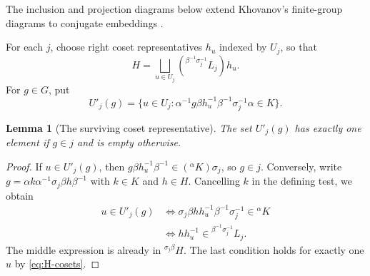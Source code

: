 \documentclass[11pt,a4paper]{article}
\numberwithin{equation}{section}
\newtheorem{lemma}[theorem]{Lemma}
\theoremstyle{definition}
\newcommand{\cg}[2]{{}^{#1}\!#2}
\begin{document}
The inclusion and projection diagrams below extend Khovanov's
finite-group diagrams to conjugate embeddings \cite[Prop.~6]{khovanov}.

For each \(j\), choose right coset representatives \(h_u\) indexed by
\(U_j\), so that
\begin{equation}\label{eq:H-cosets}
 H=\bigsqcup_{u\in U_j}(\cg{\beta^{-1}\sigma_j^{-1}}{L_j})h_u .
\end{equation}
For \(g\in G\), put
\[
 U'_j(g)=\{u\in U_j:
   \alpha^{-1}g\beta h_u^{-1}\beta^{-1}\sigma_j^{-1}\alpha\in K\}.
\]

\begin{lemma}[The surviving coset representative]\label{lem:first-filter}
The set \(U'_j(g)\) has exactly one element if \(g\in j\) and is
empty otherwise.
\end{lemma}

\begin{proof}
If \(u\in U'_j(g)\), then
\(g\beta h_u^{-1}\beta^{-1}\in(\cg{\alpha}{K})\sigma_j\), so \(g\in j\).
Conversely, write \(g=\alpha k\alpha^{-1}\sigma_j\beta h\beta^{-1}\)
with \(k\in K\) and \(h\in H\). Cancelling \(k\) in the defining test,
we obtain
\[
 \begin{aligned}
 u\in U'_j(g)
 &\iff \sigma_j\beta h h_u^{-1}\beta^{-1}\sigma_j^{-1}\in\cg{\alpha}{K}\\
 &\iff h h_u^{-1}\in\cg{\beta^{-1}\sigma_j^{-1}}{L_j}.
 \end{aligned}
\]
The middle expression is already in \(\cg{\sigma_j\beta}{H}\).
The last condition holds for exactly one \(u\) by \eqref{eq:H-cosets}.
\end{proof}
\end{document}

